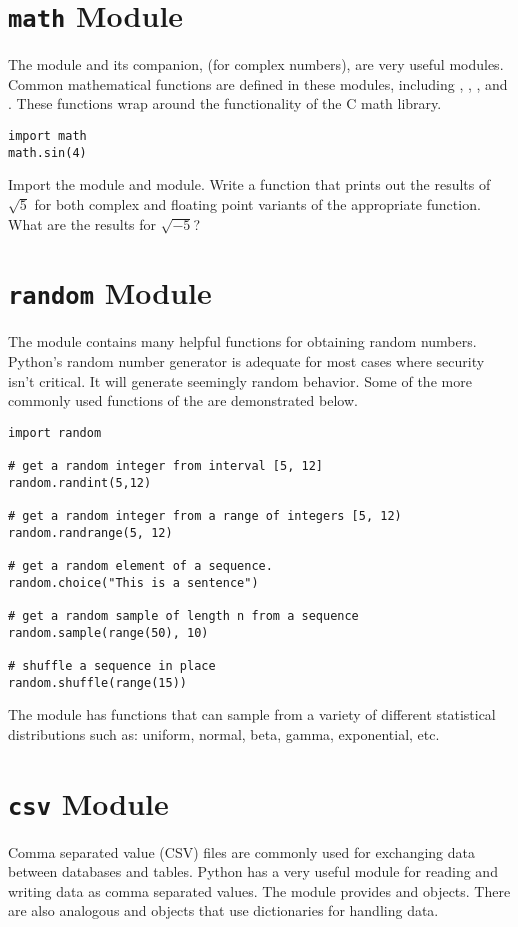 \section*{\texttt{math} Module}
The  module and its companion,  (for complex numbers), are very useful modules.
Common mathematical functions are defined in these modules, including , , , and .
These functions wrap around the functionality of the C math library.
\begin{lstlisting}
import math
math.sin(4)
\end{lstlisting}

\begin{problem}
Import the  module and  module. Write a function that prints out the results of $\sqrt{5}$ for both complex and floating point variants of the appropriate function.  What are the results for $\sqrt{-5}$?
\end{problem}

\section*{\texttt{random} Module}
The  module contains many helpful functions for obtaining random numbers.
Python's random number generator is adequate for most cases where security isn't critical.  It will generate seemingly random behavior.
Some of the more commonly used functions of the  are demonstrated below.
\begin{lstlisting}
import random

# get a random integer from interval [5, 12]
random.randint(5,12)

# get a random integer from a range of integers [5, 12)
random.randrange(5, 12)

# get a random element of a sequence.
random.choice("This is a sentence")

# get a random sample of length n from a sequence
random.sample(range(50), 10)

# shuffle a sequence in place
random.shuffle(range(15))
\end{lstlisting}
The  module has functions that can sample from a variety of different statistical distributions such as: uniform, normal, beta, gamma, exponential, etc.

\section*{\texttt{csv} Module}
Comma separated value (CSV) files are commonly used for exchanging data between databases and tables. 
Python has a very useful module for reading and writing data as comma separated values.
The  module provides  and  objects.
There are also analogous  and  objects that use dictionaries for handling data.

